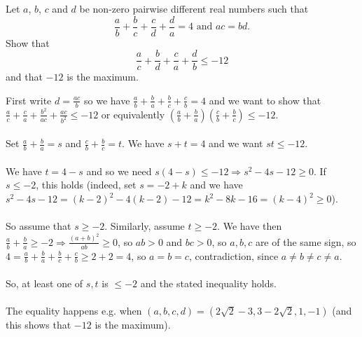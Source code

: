 \begin{problem}
    Let \( a \), \( b \), \( c \) and \( d \) be non-zero pairwise different real numbers such that
    \[
        \frac{a}{b} + \frac{b}{c} + \frac{c}{d} + \frac{d}{a} = 4 \text{ and } ac = bd.
    \]
    Show that
    \[
        \frac{a}{c} + \frac{b}{d} + \frac{c}{a} + \frac{d}{b} \leq -12
    \]
    and that \( -12 \) is the maximum.
\end{problem}
\begin{solution}
    First write \( d=\frac{ac}{b} \) so we have \( \frac{a}{b}+\frac{b}{a}+\frac{b}{c}+\frac{c}{b}=4 \) and we want to show that \( \frac{a}{c}+\frac{c}{a}+\frac{b^2}{ac}+\frac{ac}{b^2} \leqslant -12 \) or equivalently \( \left(\frac{a}{b}+\frac{b}{a}\right)\left(\frac{c}{b}+\frac{b}{c}\right) \leqslant -12 \).
    \\\\
    Set \( \frac{a}{b}+\frac{b}{a}=s \) and \( \frac{c}{b}+\frac{b}{c}=t \). We have \( s+t=4 \) and we want \( st \leqslant -12 \).
    \\\\
    We have \( t=4-s \) and so we need \( s\left(4-s\right) \leqslant -12 \Rightarrow s^2-4s-12 \geqslant 0 \). If \( s \leqslant -2 \), this holds (indeed, set \( s=-2+k \) and we have \( s^2-4s-12=\left(k-2\right)^2-4\left(k-2\right)-12=k^2-8k-16=\left(k-4\right)^2 \geqslant 0 \)).
    \\\\
    So assume that \( s \geqslant -2 \). Similarly, assume \( t \geqslant -2 \). We have then \( \frac{a}{b}+\frac{b}{a} \geqslant -2 \Rightarrow \frac{\left(a+b\right)^2}{ab}\geqslant 0 \), so \( ab>0 \) and \( bc>0 \), so \( a,b,c \) are of the same sign, so \( 4=\frac{a}{b}+\frac{b}{a}+\frac{b}{c}+\frac{c}{b} \geqslant 2+2=4 \), so \( a=b=c \), contradiction, since \( a \neq b \neq c \neq a \).
    \\\\
    So, at least one of \( s,t \) is \( \leqslant -2 \) and the stated inequality holds.
    \\\\
    The equality happens e.g. when \( \left(a,b,c,d\right)=\left(2\sqrt{2}-3,3-2\sqrt{2},1,-1\right) \) (and this shows that \( -12 \) is the maximum).
\end{solution}
